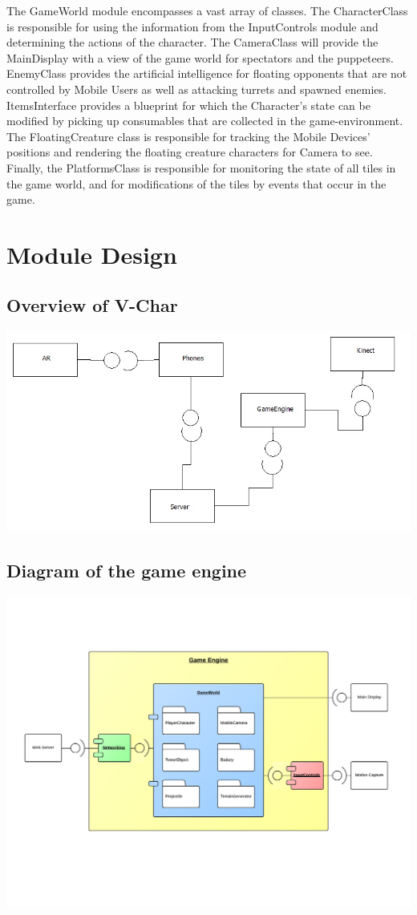 \documentclass[10pt,letterpaper,oneside,english]{article}
\begin{document}
The GameWorld module encompasses a vast array of classes. The CharacterClass is responsible for using the information from the InputControls module and determining the actions of the character. The CameraClass will provide the MainDisplay with a view of the game world for spectators and the puppeteers. EnemyClass provides the artificial intelligence for floating opponents that are not controlled by Mobile Users as well as attacking turrets and spawned enemies. ItemsInterface provides a blueprint for which the Character’s state can be modified by picking up consumables that are collected in the game-environment. The FloatingCreature class is responsible for tracking the Mobile Devices’ positions and rendering the floating creature characters for Camera to see. Finally, the PlatformsClass is responsible for monitoring the state of all tiles in the game world, and for modifications of the tiles by events that occur in the game.


\section{Module Design}
\subsection{Overview of V-Char}
\includegraphics[scale=0.7]{overview}
\subsection{Diagram of the game engine}
\includegraphics[scale=0.7]{ComponentDiagram}
\end{document}
